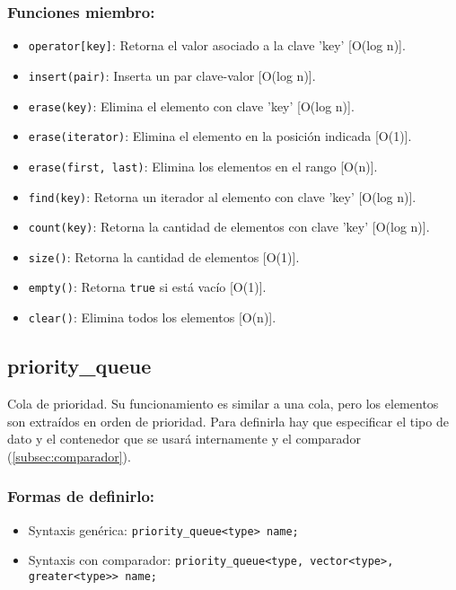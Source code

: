 \subsubsection{Funciones miembro:}
\begin{itemize}
  \item \texttt{operator[key]}: Retorna el valor asociado a la clave 'key' [O(log n)].
  \item \texttt{insert(pair)}: Inserta un par clave-valor [O(log n)]. 
  \item \texttt{erase(key)}: Elimina el elemento con clave 'key' [O(log n)].
  \item \texttt{erase(iterator)}: Elimina el elemento en la posición indicada [O(1)].
  \item \texttt{erase(first, last)}: Elimina los elementos en el rango [O(n)].
  \item \texttt{find(key)}: Retorna un iterador al elemento con clave 'key' [O(log n)]. 
  \item \texttt{count(key)}: Retorna la cantidad de elementos con clave 'key' [O(log n)]. 
  \item \texttt{size()}: Retorna la cantidad de elementos [O(1)]. 
  \item \texttt{empty()}: Retorna \texttt{true} si está vacío [O(1)]. 
  \item \texttt{clear()}: Elimina todos los elementos [O(n)]. 
\end{itemize}

\subsection{priority\_queue}
\label{subsec:std_priority_queue}
Cola de prioridad. Su funcionamiento es similar a una cola, pero los elementos son extraídos en orden de prioridad. Para definirla hay que especificar el tipo de dato y el contenedor que se usará internamente y el comparador (\ref{subsec:comparador}).

\subsubsection{Formas de definirlo:}
\begin{itemize}
  \item Syntaxis genérica: \texttt{priority\_queue<type> name;}
  \item Syntaxis con comparador: \texttt{priority\_queue<type, vector<type>, greater<type>> name;}
\end{itemize}

